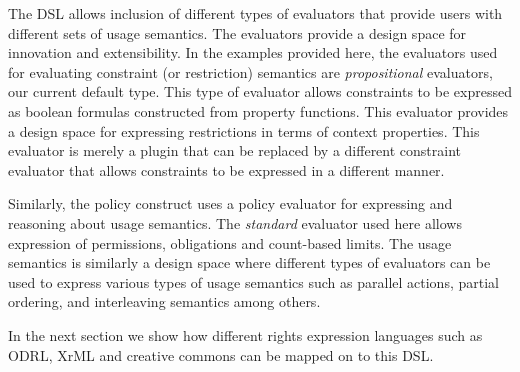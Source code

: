 The DSL allows inclusion of different types of evaluators that provide users with different sets of usage semantics. The evaluators provide a design space for innovation and extensibility. In the examples provided here, the evaluators used for evaluating constraint (or restriction) semantics are {\em propositional} evaluators, our current default type. This type of evaluator allows constraints to be expressed as boolean formulas constructed from property functions. This evaluator provides a design space for expressing restrictions in terms of context properties. This evaluator is merely a plugin that can be replaced by a different constraint evaluator that allows constraints to be expressed in a different manner. 

Similarly, the policy construct uses a policy evaluator for expressing and reasoning about usage semantics. The {\em standard} evaluator used here allows expression of permissions, obligations and count-based limits. The usage semantics is similarly a design space where different types of evaluators can be used to express various types of usage semantics such as parallel actions, partial ordering, and interleaving semantics among others.

In the next section we show how different rights expression languages such as ODRL, XrML and creative commons can be mapped on to this DSL. 